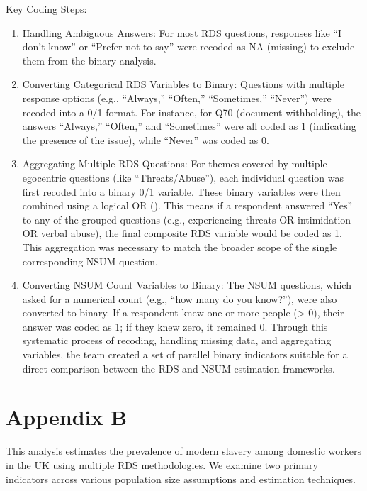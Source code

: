 \documentclass[
  12pt,
  letterpaper,
  DIV=11,
  numbers=noendperiod]{scrartcl}
\providecommand{\tightlist}{%
  \setlength{\itemsep}{0pt}\setlength{\parskip}{0pt}}
\theoremstyle{plain}
\theoremstyle{definition}
\begin{document}
Key Coding Steps:

\begin{enumerate}
\def\labelenumi{\arabic{enumi}.}
\tightlist
\item
  Handling Ambiguous Answers: For most RDS questions, responses like ``I
  don't know'' or ``Prefer not to say'' were recoded as NA (missing) to
  exclude them from the binary analysis.
\item
  Converting Categorical RDS Variables to Binary: Questions with
  multiple response options (e.g., ``Always,'' ``Often,'' ``Sometimes,''
  ``Never'') were recoded into a 0/1 format. For instance, for Q70
  (document withholding), the answers ``Always,'' ``Often,'' and
  ``Sometimes'' were all coded as 1 (indicating the presence of the
  issue), while ``Never'' was coded as 0.
\item
  Aggregating Multiple RDS Questions: For themes covered by multiple
  egocentric questions (like ``Threats/Abuse''), each individual
  question was first recoded into a binary 0/1 variable. These binary
  variables were then combined using a logical OR (\textbar). This means
  if a respondent answered ``Yes'' to any of the grouped questions
  (e.g., experiencing threats OR intimidation OR verbal abuse), the
  final composite RDS variable would be coded as 1. This aggregation was
  necessary to match the broader scope of the single corresponding NSUM
  question.
\item
  Converting NSUM Count Variables to Binary: The NSUM questions, which
  asked for a numerical count (e.g., ``how many do you know?''), were
  also converted to binary. If a respondent knew one or more people
  (\textgreater{} 0), their answer was coded as 1; if they knew zero, it
  remained 0. Through this systematic process of recoding, handling
  missing data, and aggregating variables, the team created a set of
  parallel binary indicators suitable for a direct comparison between
  the RDS and NSUM estimation frameworks.
\end{enumerate}

\section{Appendix B}\label{app-b}

This analysis estimates the prevalence of modern slavery among domestic
workers in the UK using multiple RDS methodologies. We examine two
primary indicators across various population size assumptions and
estimation techniques.
\end{document}
